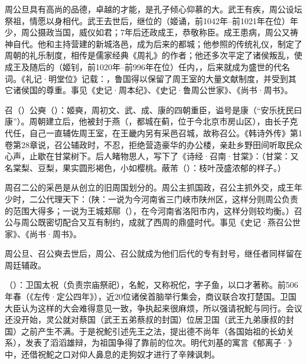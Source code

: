 周公旦具有高尚的品德，卓越的才能，是孔子倾心仰慕的大。武王有疾，周公设坛祭祖，情愿以身相代。武王去世后，继位的（姬诵，前1042年--前1021年在位）年少，周公摄政当国，威仪如君；7年后还政成王，恭敬称臣。成王患病，周公又祷神自代。他和主持营建的新城洛邑，成为后来的都城；他参照的传统礼仪，制定了周朝的礼乐制度，相传是儒家经典《周礼》的作者；他还多次平定了诸侯叛乱，使成王及随后的（姬钊，前1020年--前996年在位）任内，，后来就成为盛世的代名词。《礼记·明堂位》记载：，鲁国得以保留了周王室的大量文献制度，并受到其它诸侯国的尊重。事见《史记·周本纪》、《史记·鲁周公世家》、《尚书·周书》。

召（）公奭（）：姬奭，周初文、武、成、康的四朝重臣，谥号是康（“安乐抚民曰康”）。周朝建立后，他被封于燕（，都城在蓟，位于今北京市房山区），由长子克代任，自己一直辅佐周王室，在王畿内另有采邑召城，故称召公。《韩诗外传》第1卷第28章说，召公辅政时，不忍，拒绝营造豪华的办公楼，亲赴乡野田间听取民众心声，止歇在甘棠树下。后人睹物思人，写下了《诗经·召南·甘棠》：（甘棠：又名棠梨、豆梨，果实圆形褐色，小如樱桃。蔽芾（）：枝叶茂盛浓郁的样子。）

周召二公的采邑是从创立的旧周国划分的。周公主抓国政，召公主抓外交，成王年少时，二公代理天下：（陕：一说为今河南省三门峡市陕州区，这样分则周公负责的范围大得多；一说为王城郏鄏（），在今河南省洛阳市内，这样分则较均衡。）召公与周公既密切配合又互有制约，成就了西周的鼎盛时代。事见《史记·燕召公世家》、《尚书·周书》。

周公旦、召公奭去世后，周公、召公就成为他们后代的专有封号，继任者同样留在周廷辅政。%

（）：卫国太祝（负责宗庙祭祀），名鮀，又称祝佗，字子鱼，以口才著称。前506年春（《左传·定公四年》），近20位诸侯首脑举行集会，商议联合攻打楚国。卫国大臣认为这样的大会难得意见一致，争执起来很麻烦，所以强请祝鮀与同行。会议还没开始，灵公就对蔡国（武王五弟蔡叔的封国）位居卫国（武王九弟康叔的封国）之前产生不满。于是祝鮀引述先王之法，提出德不尚年（各国始祖的长幼关系），发表了滔滔雄辩，为祖国争得了靠前的位次。明代刘基的寓言《郁离子·》中，还借祝鮀之口对仰人鼻息的走狗奴才进行了辛辣讽刺。

